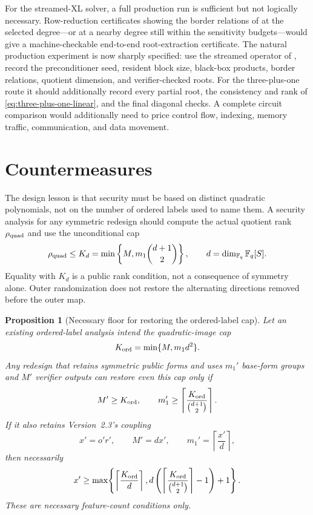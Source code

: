 \documentclass[11pt]{article}
\newtheorem{proposition}[proposition]{Proposition}
\newcommand{\F}{\mathbb F}
\begin{document}
For the streamed-XL solver, a full production run is sufficient but not logically
necessary.  Row-reduction certificates showing the border relations of
 at the selected degree---or at a nearby
degree still within the sensitivity budgets---would give a machine-checkable
end-to-end root-extraction certificate.  The natural production experiment is
now sharply specified: use the streamed operator of
, record the preconditioner seed, resident block
size, black-box products, border relations, quotient dimension, and
verifier-checked roots.  For the three-plus-one route it should additionally
record every partial root, the consistency and rank of
\eqref{eq:three-plus-one-linear}, and the final diagonal checks.  A complete
circuit comparison would additionally need
to price control flow, indexing, memory traffic, communication, and data
movement.

\section{Countermeasures}\label{sec:countermeasures}

The design lesson is that security must be based on distinct quadratic
polynomials, not on the number of ordered labels used to name them.  A security
analysis for any symmetric redesign should compute the actual quotient rank
$\rho_{\rm quad}$ and use the unconditional cap
\begin{equation}\label{eq:countermeasure-K}
 \rho_{\rm quad}\le K_d
 =\min\left\{M,m_1\binom{d+1}{2}\right\},
 \qquad d=\dim_{\F_q}\F_q[S].
\end{equation}
Equality with $K_d$ is a public rank condition, not a consequence of symmetry
alone.  Outer randomization does not restore the alternating directions removed
before the outer map.

\begin{proposition}[Necessary floor for restoring the ordered-label cap]
\label{prop:repair-floor}
Let an existing ordered-label analysis intend the quadratic-image cap
\[
 K_{\rm ord}=\min\{M,m_1d^2\}.
\]
Any redesign that retains symmetric public forms and uses $m_1'$ base-form
groups and $M'$ verifier outputs can restore even this cap only if
\begin{equation}\label{eq:repair-necessary}
 M'\ge K_{\rm ord},
 \qquad
 m_1'\ge
 \left\lceil\frac{K_{\rm ord}}{\binom{d+1}{2}}\right\rceil.
\end{equation}
If it also retains Version~2.3's coupling
\[
 x'=o'r',\qquad M'=dx',\qquad m_1'=\left\lceil\frac{x'}d\right\rceil,
\]
then necessarily
\begin{equation}\label{eq:repair-x-floor}
 x'\ge
 \max\!\left\{
 \left\lceil\frac{K_{\rm ord}}d\right\rceil,
 d\left(
 \left\lceil\frac{K_{\rm ord}}{\binom{d+1}{2}}\right\rceil-1
 \right)+1
 \right\}.
\end{equation}
These are necessary feature-count conditions only.
\end{proposition}
\end{document}
